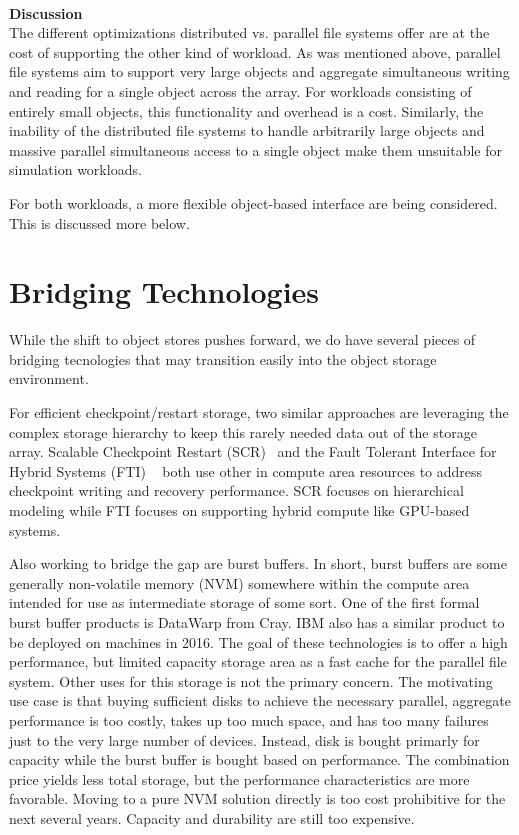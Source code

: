 ~\\\noindent\textbf{Discussion}\\
The different optimizations distributed vs. parallel file systems offer are at
the cost of supporting the other kind of workload. As was mentioned above,
parallel file systems aim to support very large objects and aggregate
simultaneous writing and reading for a single object across the array. For
workloads consisting of entirely small objects, this functionality and overhead
is a cost. Similarly, the inability of the distributed file systems to handle
arbitrarily large objects and massive parallel simultaneous access to a single
object make them unsuitable for simulation workloads.

For both workloads, a more flexible object-based interface are being
considered. This is discussed more below.

\section{Bridging Technologies}

While the shift to object stores pushes forward, we do have several pieces of
bridging tecnologies that may transition easily into the object storage
environment.

For efficient checkpoint/restart storage, two similar approaches are leveraging
the complex storage hierarchy to keep this rarely needed data out of the
storage array. Scalable Checkpoint Restart (SCR)~\cite{moody:2010:scr} and the
Fault Tolerant Interface for Hybrid Systems (FTI) ~\cite{bautista:2011:fti}
both use other in compute area resources to address checkpoint writing and
recovery performance. SCR focuses on hierarchical modeling while FTI focuses on
supporting hybrid compute like GPU-based systems.

Also working to bridge the gap are burst buffers. In short, burst buffers are
some generally non-volatile memory (NVM) somewhere within the compute area
intended for use as intermediate storage of some sort.  One of the first formal
burst buffer products is DataWarp from Cray. IBM also has a similar product to
be deployed on machines in 2016. The goal of these technologies is to offer a
high performance, but limited capacity storage area as a fast cache for the
parallel file system. Other uses for this storage is not the primary concern.
The motivating use case is that buying sufficient disks to achieve the
necessary parallel, aggregate performance is too costly, takes up too much
space, and has too many failures just to the very large number of devices.
Instead, disk is bought primarly for capacity while the burst buffer is bought
based on performance. The combination price yields less total storage, but the
performance characteristics are more favorable. Moving to a pure NVM solution
directly is too cost prohibitive for the next several years. Capacity and
durability are still too expensive.

